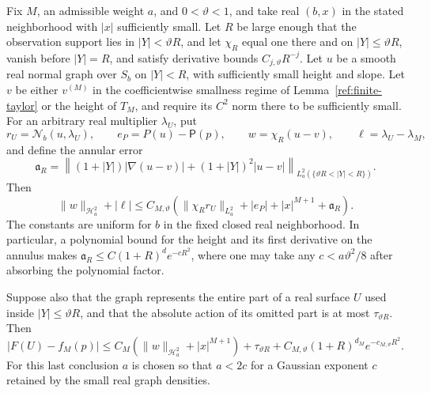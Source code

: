 \begin{lemma}
\label{ref:real-comparison}
Fix $M$, an admissible weight $a$, and $0<\vartheta<1$, and take
real $(b,x)$ in the stated neighborhood with $|x|$ sufficiently small.
Let $R$ be
large enough that the observation support lies in $|Y|<\vartheta R$,
and let $\chi_R$ equal one there and on $|Y|\le\vartheta R$, vanish
before $|Y|=R$, and satisfy derivative bounds $C_{j,\vartheta}R^{-j}$.
Let $u$ be a smooth real normal graph over $S_b$
on $|Y|<R$, with sufficiently small height and slope.  Let $v$ be
either $v^{(M)}$ in the coefficientwise smallness regime of
Lemma~\ref{ref:finite-taylor} or the height of $T_M$, and require its
$C^2$ norm there to be sufficiently small.  For an arbitrary real
multiplier $\lambda_U$, put
\[
 r_U=\mathcal N_b(u,\lambda_U),\qquad
 e_P=P(u)-\mathsf P(p),\qquad
 w=\chi_R(u-v),\qquad \ell=\lambda_U-\lambda_M,
\]
and define the annular error
\[
 \mathfrak a_R=
 \left\|(1+|Y|)|\nabla(u-v)|+(1+|Y|)^2|u-v|
 \right\|_{L^2_a(\{\vartheta R<|Y|<R\})}.
\]
Then
\begin{equation}\label{ref:real-comparison-estimate}
 \|w\|_{\mathcal H^2_a}+|\ell|
 \le C_{M,\vartheta}\left(\|\chi_R r_U\|_{L^2_a}+|e_P|
                    +|x|^{M+1}+\mathfrak a_R\right).
\end{equation}
The constants are uniform for $b$ in the fixed closed real neighborhood.
In particular, a polynomial bound for the height and its first derivative
on the annulus makes $\mathfrak a_R\le C(1+R)^d e^{-cR^2}$, where one
may take any $c<a\vartheta^2/8$ after absorbing the polynomial factor.

Suppose also that the graph represents the entire part of a real surface
$U$ used inside $|Y|\le\vartheta R$, and that the absolute action of
its omitted part is at most $\tau_{\vartheta R}$.  Then
\begin{equation}\label{ref:real-action-estimate}
 |F(U)-f_M(p)|\le C_M\left(\|w\|_{\mathcal H^2_a}
                         +|x|^{M+1}\right)
                 +\tau_{\vartheta R}
                 +C_{M,\vartheta}(1+R)^{d_M}e^{-c_{M,\vartheta}R^2}.
\end{equation}
For this last conclusion $a$ is chosen so that $a<2c$ for a Gaussian
exponent $c$ retained by the small real graph densities.
\end{lemma}


